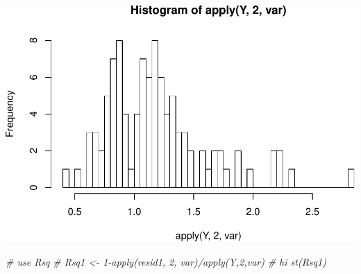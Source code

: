 \documentclass[11pt,]{article}
\newenvironment{Shaded}{\begin{snugshade}}{\end{snugshade}}
\newcommand{\CommentTok}[1]{\textcolor[rgb]{0.56,0.35,0.01}{\textit{#1}}}
\begin{document}
\includegraphics{hw3_files/figure-latex/unnamed-chunk-2-4.pdf}

\begin{Shaded}
\begin{Highlighting}[]
\CommentTok{# use Rsq }
\CommentTok{# Rsq1 <- 1-apply(resid1, 2, var)/apply(Y,2,var)}
\CommentTok{# hi st(Rsq1)}
\end{Highlighting}
\end{Shaded}
\newpage
\singlespacing 
\end{document}

